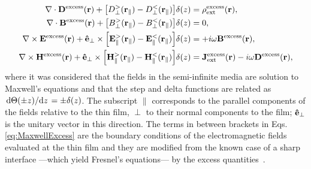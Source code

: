 %
\begin{subequations}%
\begin{align}
	\nabla\cdot\vb{D}^\text{excess}(\vb{r}) + \qty[D_\perp^>(\vb{r}_\parallel)-D_\perp^<(\vb{r}_\parallel)]\delta(z)  & = \rho^\text{excess}_\text{ext}(\vb{r}),\\
%	
	\nabla\cdot\vb{B}^\text{excess}(\vb{r}) + \qty[B_\perp^>(\vb{r}_\parallel)-B_\perp^<(\vb{r}_\parallel)]\delta(z)  & = 0,\\
%	
	\nabla\times\vb{E}^\text{excess}(\vb{r}) + \vu{e}_\perp \times \qty[\vb{E}^>_\parallel(\vb{r}_\parallel)-\vb{E}^<_\parallel(\vb{r}_\parallel)]\delta(z) & = +i\omega\vb{B}^\text{excess}(\vb{r}),\\
%	
	\nabla\times\vb{H}^\text{excess}(\vb{r}) + \vu{e}_\perp \times \qty[\vb{H}^>_\parallel(\vb{r}_\parallel)-\vb{H}^<_\parallel(\vb{r}_\parallel)]\delta(z) & = \vb{J}^\text{excess}_\text{ext}(\vb{r}) -i\omega\vb{D}^\text{excess}(\vb{r}),
\end{align}\label{eq:MaxwellExcess}%
\end{subequations}
%
where it was considered that the fields in the semi-infinite media are solution to Maxwell's equations and that the step and delta functions are related as $\dv*{\Theta(\pm z)}{z} = \pm \delta(z)$. The subscript $\parallel$ corresponds to the parallel components of the fields relative to the thin film, $\perp$ to their normal components to the film; $\vu{e}_\perp$ is the unitary vector in this direction. The terms in between brackets in Eqs. \eqref{eq:MaxwellExcess} are the boundary conditions of the electromagnetic fields evaluated at the thin film and they are modified from the known case of a sharp interface ---which yield Fresnel's equations--- by the excess quantities~\cite{bedeaux_optical_2004}.

